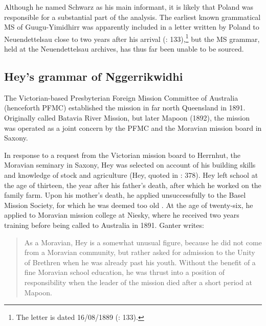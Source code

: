 Although he named Schwarz as his main informant, it is likely that Poland was responsible for a substantial part of the analysis. The earliest known grammatical MS of Guugu-Yimidhirr was apparently included in a letter written by Poland to Neuendettelsau close to two years after his arrival (\citealt{haviland_how_1980}: 133),\footnote{The letter is dated 16/08/1889 (\citealt{haviland_how_1980}: 133).} but the MS grammar, held at the Neuendettelsau archives, has thus far been unable to be sourced.

\subsection{Hey’s grammar of Nggerrikwidhi \citeyearpar{hey_elementary_1903}}
\label{sec:key:10.1.3}\label{bkm:Ref76120332}\label{bkm:Ref74336064}\label{bkm:Ref516423848}\label{bkm:Ref514607540}
The Victorian-based Presbyterian Foreign Mission Committee of Australia (henceforth PFMC) established the mission in far north Queensland in 1891. Originally called Batavia River Mission, but later Mapoon (1892), the mission was operated as a joint concern by the PFMC and the Moravian mission board in Saxony.

In response to a request from the Victorian mission board to Herrnhut, the Moravian seminary in Saxony, Hey was selected on account of his building skills and knowledge of stock and agriculture (Hey, quoted in \citealt{edwards_moravian_2007}: 378). Hey left school at the age of thirteen, the year after his father’s death, after which he worked on the family farm. Upon his mother’s death, he applied unsuccessfully to the Basel Mission Society, for which he was deemed too old \citep{ganter_killalpaninna_2016}. At the age of twenty-six, he applied to Moravian mission college at Niesky, where he received two years training before being called to Australia in 1891. Ganter writes:

\begin{quote}
As a Moravian, Hey is a somewhat unusual figure, because he did not come from a Moravian community, but rather asked for admission to the Unity of Brethren when he was already past his youth. Without the benefit of a fine Moravian school education, he was thrust into a position of responsibility when the leader of the mission died after a short period at Mapoon. \citep{ganter_killalpaninna_2016}
\end{quote}

